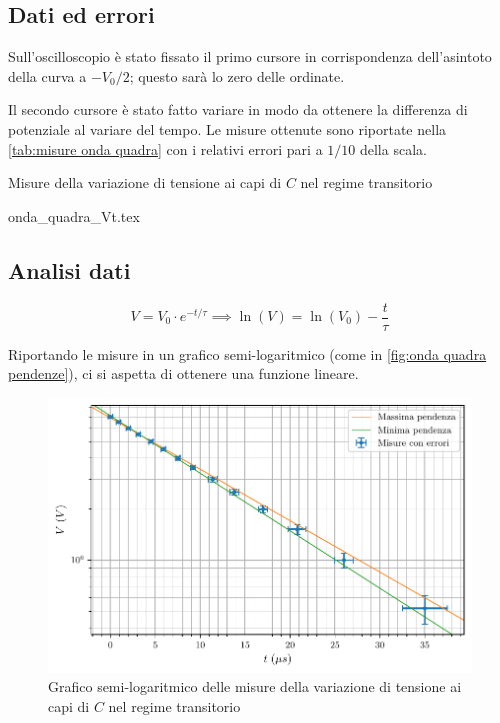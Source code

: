 \documentclass[11pt, a4paper]{article}
\numberwithin{equation}{section} %
\begin{document}
\subsection{Dati ed errori}

Sull'oscilloscopio è stato fissato il primo cursore in corrispondenza dell'asintoto della curva a \(- V_{0}/2\); questo sarà lo zero delle ordinate.

Il secondo cursore è stato fatto variare in modo da ottenere la differenza di potenziale al variare del tempo. Le misure ottenute sono riportate nella \autoref{tab:misure onda quadra} con i relativi errori pari a $1/10$ della scala.

\begin{table}[ht!]
    \centering
    \caption{Misure della variazione di tensione ai capi di $C$ nel regime transitorio}
    {onda_quadra_Vt.tex}
    \label{tab:misure onda quadra}
\end{table}

\subsection{Analisi dati}

\begin{equation*}
    V = V_{0} \cdot e^{-t/\tau} \implies \ln(V) = \ln(V_{0}) - \frac{t}{\tau}
\end{equation*}

Riportando le misure in un grafico semi-logaritmico (come in \autoref{fig:onda quadra pendenze}), ci si aspetta di ottenere una funzione lineare.

\begin{figure}[ht!]
    \includegraphics{onda_quadra_V(t)_pendenze.pdf}
    \caption{Grafico semi-logaritmico delle misure della variazione di tensione ai capi di $C$ nel regime transitorio}
    \label{fig:onda quadra pendenze}
\end{figure}
\end{document}
